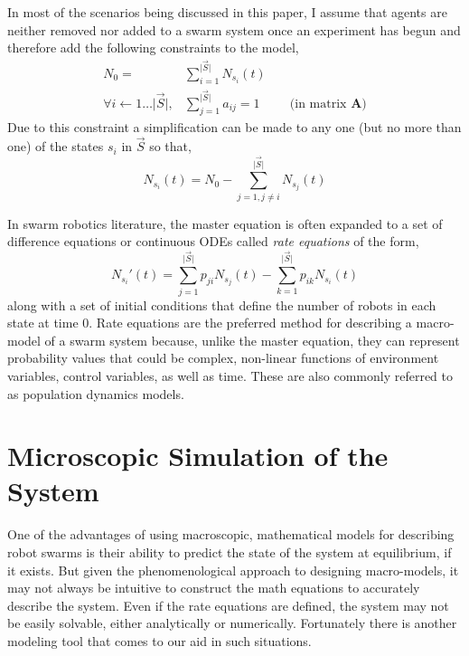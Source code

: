 \documentclass[defaultstyle,12pt]{proposal}
\newcommand{\abs}[1]{\lvert#1\rvert}
\begin{document}
In most of the scenarios being discussed in this paper, I assume that agents are neither removed nor added to a swarm system once an experiment has begun and therefore add the following constraints to the model,
\begin{align}
N_0 = & \sum\limits^{\abs{\vec{S}}}_{i=1} N_{s_i}(t)\\
\forall i \gets 1\ldots\abs{\vec{S}}, & \sum\limits^{\abs{\vec{S}}}_{j=1}a_{ij} = 1 \hspace{1cm}\text{(in matrix $\mathbf{A}$)}
\end{align}
Due to this constraint a simplification can be made to any one (but no more than one) of the states $s_i$ in $\vec{S}$ so that,
\begin{equation}
	N_{s_i}(t) = N_0 - \sum\limits_{j=1,j\not=i}^{\abs{\vec{S}}}N_{s_j}(t)
\end{equation}

In swarm robotics literature, the master equation is often expanded to a set of difference equations or continuous ODEs called \emph{rate equations} of the form,
\begin{equation}\label{eq:rateeqns}
	N_{s_i}'(t) = \sum\limits_{j=1}^{\abs{\vec{S}}}p_{ji}N_{s_j}(t) - \sum\limits_{k=1}^{\abs{\vec{S}}}p_{ik}N_{s_i}(t)
\end{equation}
along with a set of initial conditions that define the number of robots in each state at time 0. Rate equations are the preferred method for describing a macro-model of a swarm system because, unlike the master equation, they can represent probability values that could be complex, non-linear functions of environment variables, control variables, as well as time. These are also commonly referred to as population dynamics models.

\section{Microscopic Simulation of the System}
One of the advantages of using macroscopic, mathematical models for describing robot swarms is their ability to predict the state of the system at equilibrium, if it exists. But given the phenomenological approach to designing macro-models, it may not always be intuitive to construct the math equations to accurately describe the system. Even if the rate equations are defined, the system may not be easily solvable, either analytically or numerically. Fortunately there is another modeling tool that comes to our aid in such situations. 
\end{document}

